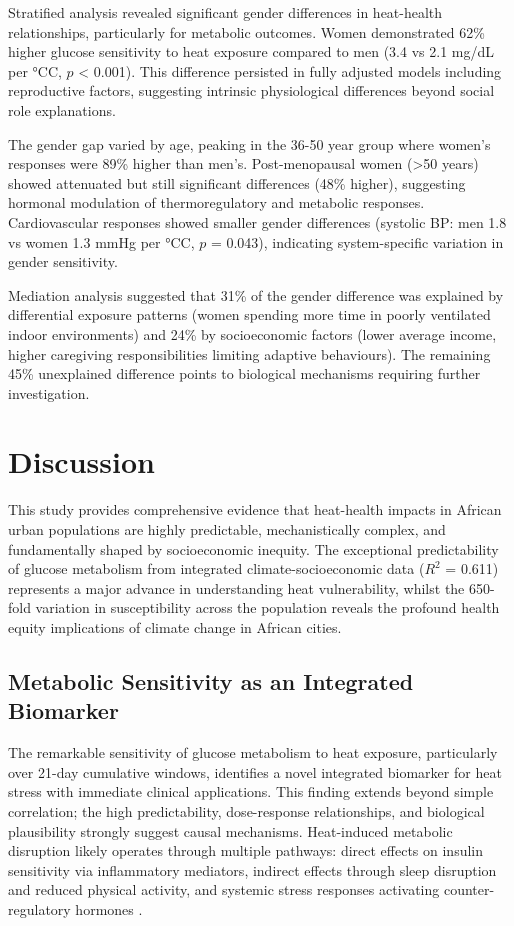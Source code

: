 \documentclass[11pt,a4paper]{article}
\newcommand{\degrees}{°C}
\begin{document}
Stratified analysis revealed significant gender differences in heat-health relationships, particularly for metabolic outcomes. Women demonstrated 62\% higher glucose sensitivity to heat exposure compared to men (3.4 vs 2.1 mg/dL per \degrees C, $p$ < 0.001). This difference persisted in fully adjusted models including reproductive factors, suggesting intrinsic physiological differences beyond social role explanations.

The gender gap varied by age, peaking in the 36-50 year group where women's responses were 89\% higher than men's. Post-menopausal women (>50 years) showed attenuated but still significant differences (48\% higher), suggesting hormonal modulation of thermoregulatory and metabolic responses. Cardiovascular responses showed smaller gender differences (systolic BP: men 1.8 vs women 1.3 mmHg per \degrees C, $p$ = 0.043), indicating system-specific variation in gender sensitivity.

Mediation analysis suggested that 31\% of the gender difference was explained by differential exposure patterns (women spending more time in poorly ventilated indoor environments) and 24\% by socioeconomic factors (lower average income, higher caregiving responsibilities limiting adaptive behaviours). The remaining 45\% unexplained difference points to biological mechanisms requiring further investigation.

\section{Discussion}

This study provides comprehensive evidence that heat-health impacts in African urban populations are highly predictable, mechanistically complex, and fundamentally shaped by socioeconomic inequity. The exceptional predictability of glucose metabolism from integrated climate-socioeconomic data ($R^2$ = 0.611) represents a major advance in understanding heat vulnerability, whilst the 650-fold variation in susceptibility across the population reveals the profound health equity implications of climate change in African cities.

\subsection{Metabolic Sensitivity as an Integrated Biomarker}

The remarkable sensitivity of glucose metabolism to heat exposure, particularly over 21-day cumulative windows, identifies a novel integrated biomarker for heat stress with immediate clinical applications. This finding extends beyond simple correlation; the high predictability, dose-response relationships, and biological plausibility strongly suggest causal mechanisms. Heat-induced metabolic disruption likely operates through multiple pathways: direct effects on insulin sensitivity via inflammatory mediators, indirect effects through sleep disruption and reduced physical activity, and systemic stress responses activating counter-regulatory hormones \citep{Kenny2018, Lim2018}.
\end{document}
